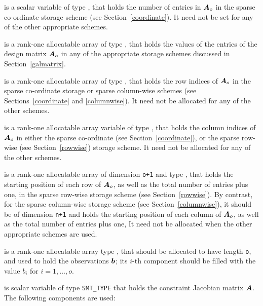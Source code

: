 \documentclass{galahad}
\begin{document}
\begin{description}
\begin{description}
 is a scalar variable of type \integer, that
holds the number of entries in ${\bm{A}}_o$
in the sparse co-ordinate storage scheme (see Section~\ref{coordinate}).
It need not be set for any of the other appropriate schemes.

 is a rank-one allocatable array of type \realdp, that
holds the values of the entries of the design matrix ${\bm{A}}_o$ in any of the
appropriate storage schemes discussed in Section~\ref{galmatrix}.

 is a rank-one allocatable array of type \integer,
that holds the row indices of ${\bm{A}}_o$ in the sparse co-ordinate storage
or sparse column-wise schemes
(see Sections~\ref{coordinate} and \ref{columnwise}).
It need not be allocated for any of the other schemes.

 is a rank-one allocatable array variable of type \integer,
that holds the column indices of ${\bm{A}}_o$ in either the sparse co-ordinate
(see Section~\ref{coordinate}), or the sparse row-wise
(see Section~\ref{rowwise}) storage scheme.
It need not be allocated for any of the other schemes.

 is a rank-one allocatable array of dimension {\tt o+1} and type
\integer, that holds the starting position of each row of ${\bm{A}}_o$,
as well as the total number of entries plus one,
in the sparse row-wise storage scheme (see Section~\ref{rowwise}).
By contrast, for the sparse column-wise storage scheme
(see Section~\ref{columnwise}), it should be of dimension {\tt n+1}
and holds the starting position of each column of ${\bm{A}}_o$,
as well as the total number of entries plus one,
It need not be allocated when the other appropriate schemes are used.

\end{description}

 is a rank-one allocatable array type \realdp, that
should be allocated to have length {\tt o}, and used to hold
the observations ${\bm{b}}$; its $i$-th component should be
filled with the value $b_{i}$ for $i = 1, \ldots , o$.

 is scalar variable of type {\tt SMT\_TYPE}
that holds the constraint Jacobian matrix ${\bm{A}}$.
The following components are used:

\begin{description}


\end{description}
\end{description}
\end{document}
